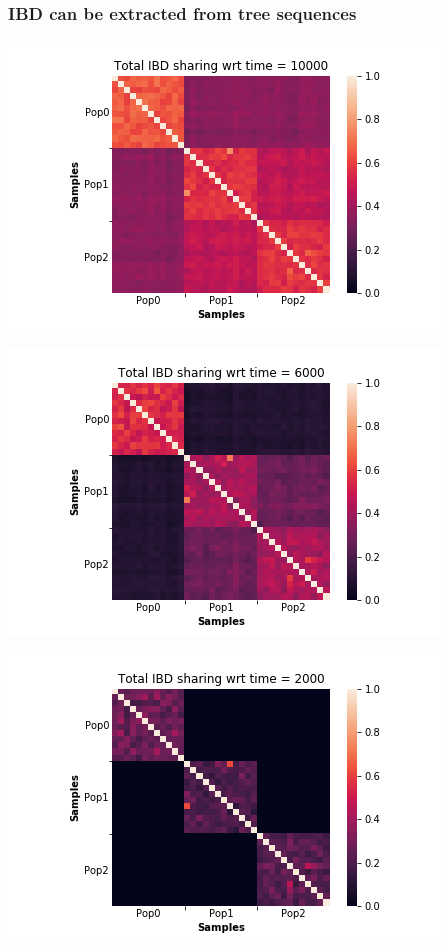\documentclass[11pt, mathserif, aspectratio=169]{beamer}
\begin{document}
\begin{frame}
\frametitle{IBD can be extracted from tree sequences}
\begin{minipage}{.75\linewidth}

\begin{minipage}{.33\linewidth}
\includegraphics[scale=.2]{pics/kinships-10000.png}
\end{minipage}\begin{minipage}{.33\linewidth}
\includegraphics[scale=.2]{pics/kinships-6000.png}
\end{minipage}\begin{minipage}{.33\linewidth}
\includegraphics[scale=.2]{pics/kinships-2000.png}
\end{minipage}


\end{minipage}
\end{frame}
\end{document}
